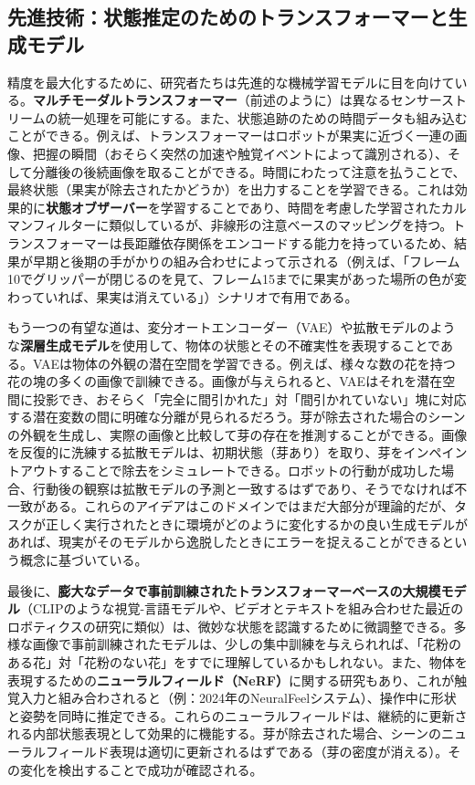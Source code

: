 \documentclass[a4paper,fleqn,10pt,twocolumn]{template_v1.0}
\begin{document}
\subsection{先進技術：状態推定のためのトランスフォーマーと生成モデル}
精度を最大化するために、研究者たちは先進的な機械学習モデルに目を向けている。\textbf{マルチモーダルトランスフォーマー}（前述のように）は異なるセンサーストリームの統一処理を可能にする。また、状態追跡のための時間データも組み込むことができる。例えば、トランスフォーマーはロボットが果実に近づく一連の画像、把握の瞬間（おそらく突然の加速や触覚イベントによって識別される）、そして分離後の後続画像を取ることができる。時間にわたって注意を払うことで、最終状態（果実が除去されたかどうか）を出力することを学習できる。これは効果的に\textbf{状態オブザーバー}を学習することであり、時間を考慮した学習されたカルマンフィルターに類似しているが、非線形の注意ベースのマッピングを持つ。トランスフォーマーは長距離依存関係をエンコードする能力を持っているため、結果が早期と後期の手がかりの組み合わせによって示される（例えば、「フレーム10でグリッパーが閉じるのを見て、フレーム15までに果実があった場所の色が変わっていれば、果実は消えている」）シナリオで有用である。

もう一つの有望な道は、変分オートエンコーダー（VAE）や拡散モデルのような\textbf{深層生成モデル}を使用して、物体の状態とその不確実性を表現することである。VAEは物体の外観の潜在空間を学習できる。例えば、様々な数の花を持つ花の塊の多くの画像で訓練できる。画像が与えられると、VAEはそれを潜在空間に投影でき、おそらく「完全に間引かれた」対「間引かれていない」塊に対応する潜在変数の間に明確な分離が見られるだろう。芽が除去された場合のシーンの外観を生成し、実際の画像と比較して芽の存在を推測することができる。画像を反復的に洗練する拡散モデルは、初期状態（芽あり）を取り、芽をインペイントアウトすることで除去をシミュレートできる。ロボットの行動が成功した場合、行動後の観察は拡散モデルの予測と一致するはずであり、そうでなければ不一致がある。これらのアイデアはこのドメインではまだ大部分が理論的だが、タスクが正しく実行されたときに環境がどのように変化するかの良い生成モデルがあれば、現実がそのモデルから逸脱したときにエラーを捉えることができるという概念に基づいている。

最後に、\textbf{膨大なデータで事前訓練されたトランスフォーマーベースの大規模モデル}（CLIPのような視覚-言語モデルや、ビデオとテキストを組み合わせた最近のロボティクスの研究に類似）は、微妙な状態を認識するために微調整できる。多様な画像で事前訓練されたモデルは、少しの集中訓練を与えられれば、「花粉のある花」対「花粉のない花」をすでに理解しているかもしれない。また、物体を表現するための\textbf{ニューラルフィールド（NeRF）}に関する研究もあり、これが触覚入力と組み合わされると（例：2024年のNeuralFeelシステム）、操作中に形状と姿勢を同時に推定できる。これらのニューラルフィールドは、継続的に更新される内部状態表現として効果的に機能する。芽が除去された場合、シーンのニューラルフィールド表現は適切に更新されるはずである（芽の密度が消える）。その変化を検出することで成功が確認される。
\end{document}
